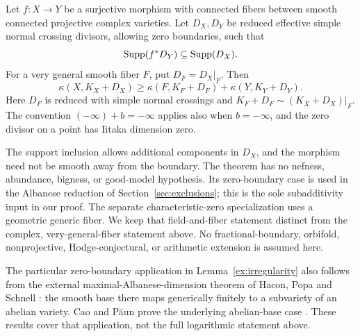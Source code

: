\begin{theorem}
\label{asm:iitaka}
Let \(f:X\to Y\) be a surjective morphism with connected fibers between
smooth connected projective complex varieties. Let \(D_X,D_Y\) be
reduced effective simple normal crossing divisors, allowing zero
boundaries, such that
\[
  \operatorname{Supp}(f^*D_Y)\subseteq\operatorname{Supp}(D_X).
\]
For a very general smooth fiber \(F\), put \(D_F=D_X|_F\). Then
\[
 \kappa(X,K_X+D_X)\ge
 \kappa(F,K_F+D_F)+\kappa(Y,K_Y+D_Y).
\]
Here \(D_F\) is reduced with simple normal crossings and
\(K_F+D_F\sim(K_X+D_X)|_F\). The convention
\((-\infty)+b=-\infty\) applies also when \(b=-\infty\), and the zero
divisor on a point has Iitaka dimension zero.
\end{theorem}

The support inclusion allows additional components in \(D_X\), and
the morphism need not be smooth away from the boundary. The theorem
has no nefness, abundance, bigness, or good-model hypothesis. Its
zero-boundary case is used in the Albanese reduction of
Section~\ref{sec:exclusions}; this is the sole subadditivity input in
our proof. The separate characteristic-zero specialization
\cite[Corollary~6.3]{OpenAIIitaka2026} uses a geometric generic fiber.
We keep that field-and-fiber statement distinct from the complex,
very-general-fiber statement above. No fractional-boundary,
orbifold, nonprojective, Hodge-conjectural, or arithmetic extension
is assumed here.

The particular zero-boundary application in Lemma~\ref{ex:irregularity}
also follows from the external maximal-Albanese-dimension theorem of
Hacon, Popa and Schnell \cite[Theorem~1.1]{HaconPopaSchnell2017}:
the smooth base there maps generically finitely to a subvariety of an
abelian variety. Cao and P\u{a}un prove the underlying abelian-base
case \cite[Theorem~1.1]{CaoPaunAbelian2016}. These results cover that
application, not the full logarithmic statement above.

